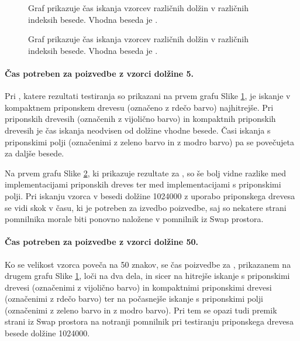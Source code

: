 \begin{figure}[htb]
    \centering
    
    \caption{Graf prikazuje čas iskanja vzorcev različnih dolžin v različnih indeksih besede. Vhodna beseda je \DNK.} 
    \label{fig:IskanjeGraf}
\end{figure}

\begin{figure}[htb]
    \centering
    
    \caption{Graf prikazuje čas iskanja vzorcev različnih dolžin v različnih indeksih besede. Vhodna beseda je \NK.} 
    \label{fig:IskanjeGrafSLO}
\end{figure}

\paragraph{Čas potreben za poizvedbe z vzorci dolžine 5.}

Pri \DNK, katere rezultati testiranja so prikazani na prvem grafu Slike \ref{fig:IskanjeGraf}, je iskanje v kompaktnem priponskem drevesu (označeno z rdečo barvo) najhitrejše. Pri priponskih drevesih (označenih z vijolično barvo) in kompaktnih priponskih drevesih je čas iskanja neodvisen od dolžine vhodne besede. Časi iskanja s priponskimi polji (označenimi z zeleno barvo in z modro barvo) pa se povečujeta za daljše besede.

Na prvem grafu Slike \ref{fig:IskanjeGrafSLO}, ki prikazuje rezultate za \NK, so še bolj vidne razlike med implementacijami priponskih dreves ter med implementacijami s priponskimi polji. Pri iskanju vzorca v besedi dolžine 1024000 z uporabo priponskega drevesa se vidi skok v času, ki je potreben za izvedbo poizvedbe, saj so nekatere strani pomnilnika morale biti ponovno naložene v pomnilnik iz Swap prostora.

\paragraph{Čas potreben za poizvedbe z vzorci dolžine 50.}

Ko se velikost vzorca poveča na 50 znakov, se čas poizvedbe za \DNK, prikazanem na drugem grafu Slike \ref{fig:IskanjeGraf}, loči na dva dela, in sicer na hitrejše iskanje s priponskimi drevesi (označenimi z vijolično barvo) in kompaktnimi priponskimi drevesi (označenimi z rdečo barvo) ter na počasnejše iskanje s priponskimi polji (označenimi z zeleno barvo in z modro barvo). Pri tem se opazi tudi premik strani iz Swap prostora na notranji pomnilnik pri testiranju priponskega drevesa besede dolžine 1024000.

